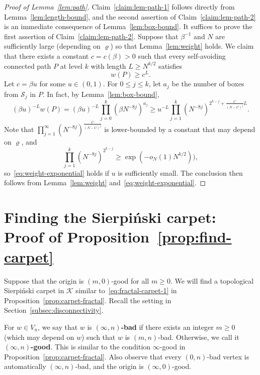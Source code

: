\documentclass[a4paper]{article}
\numberwithin{equation}{section}
\numberwithin{equation}{section}
\renewcommand{\1}{\mathbf{1}}
\begin{document}
\begin{proof}[Proof of Lemma~\ref{lem:path}]
    Claim~\ref{claim:lem-path-1} follows directly from Lemma~\ref{lem:length-bound}, and the second assertion of Claim~\ref{claim:lem-path-2} is an immediate consequence of Lemma~\ref{lem:box-bound}. It suffices to prove the first assertion of Claim~\ref{claim:lem-path-2}. Suppose that $\beta^{-1}$ and $N$ are sufficiently large (depending on $\varrho$) so that Lemma~\ref{lem:weight} holds. We claim that there exists a constant $c = c(\beta)>0$ such that every self-avoiding connected path $P$ at level $k$ with length $L \geq N^{k/2}$ satisfies
    \begin{equation}\label{eq:weight-exponential}
        w(P) \geq c^L.
    \end{equation}
    Let $c = \beta u$ for some $u \in (0,1)$. For $0 \leq j \leq k$, let $a_j$ be the number of boxes from $\mathcal{S}_j$ in $P$. In fact, by Lemma~\ref{lem:box-bound},
    $$
    (\beta u)^{-L} w(P) = (\beta u)^{-L} \prod_{j=0}^k (\beta N^{-8j})^{a_j}  \geq u^{-L} \prod_{j=1}^k (N^{-8j})^{2^{k-j} + \frac{C}{(N - C)^j} L}.
    $$
    Note that $\prod_{j=1}^\infty (N^{-8j})^{\frac{C}{(N - C)^j}}$ is lower-bounded by a constant that may depend on $\varrho$, and 
    $$
    \prod_{j=1}^k (N^{-8j})^{2^{k-j}} \geq \exp (-o_N(1) N^{k/2})),
    $$
    so~\eqref{eq:weight-exponential} holds if $u$ is sufficiently small. The conclusion then follows from Lemma~\ref{lem:weight} and~\eqref{eq:weight-exponential}.
\end{proof}

\section{Finding the Sierpi\'nski carpet: Proof of Proposition~\ref{prop:find-carpet}}\label{sec:carpet}

Suppose that the origin is $(m,0)$-good for all $m \geq 0$. We will find a topological Sierpi\'nski carpet in $\mathcal{K}$ similar to~\eqref{eq:fractal-carpet-1} in Proposition~\ref{prop:carpet-fractal}. Recall the setting in Section~\ref{subsec:disconnectivity}.

For $w \in V_n$, we say that $w$ is \textbf{$(\infty, n)$-bad} if there exists an integer $m\geq 0$ (which may depend on $w$) such that $w$ is $(m,n)$-bad. Otherwise, we call it \textbf{$(\infty, n)$-good}. This is similar to the condition $\infty$-good in Proposition~\ref{prop:carpet-fractal}. Also observe that every $(0,n)$-bad vertex is automatically $(\infty, n)$-bad, and the origin is $(\infty, 0)$-good. 
\end{document}
